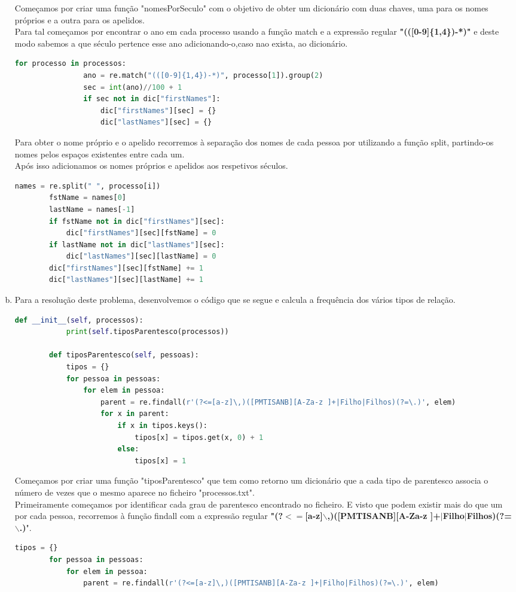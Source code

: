 \documentclass[11pt,a4paper]{report}%
\begin{document}
\begin{enumerate}[a)]
	Começamos por criar uma função "nomesPorSeculo" com o objetivo de obter um dicionário com duas chaves, uma para os nomes próprios e a outra para os apelidos.\\
	Para tal começamos por encontrar o ano em cada processo usando a função match e a expressão regular \textbf{"(([0-9]\{1,4\})-*)"} e deste modo sabemos a que século pertence esse ano adicionando-o,caso nao exista, ao dicionário.
	\begin{lstlisting}[language=python]
			for processo in processos:
				ano = re.match("(([0-9]{1,4})-*)", processo[1]).group(2)
				sec = int(ano)//100 + 1
				if sec not in dic["firstNames"]:
					dic["firstNames"][sec] = {}
					dic["lastNames"][sec] = {}
	\end{lstlisting}
	Para obter o nome próprio e o apelido recorremos à separação dos nomes de cada pessoa por utilizando a função split, partindo-os nomes pelos espaços existentes entre cada um.\\
	Após isso adicionamos os nomes próprios e apelidos aos respetivos séculos.
	\begin{lstlisting}[language=python]
		names = re.split(" ", processo[i])
		fstName = names[0]
		lastName = names[-1]
		if fstName not in dic["firstNames"][sec]:
			dic["firstNames"][sec][fstName] = 0
		if lastName not in dic["lastNames"][sec]:
			dic["lastNames"][sec][lastName] = 0
		dic["firstNames"][sec][fstName] += 1
		dic["lastNames"][sec][lastName] += 1
	\end{lstlisting}
	
	
	\newpage
	
	
	\item Para a resolução deste problema, desenvolvemos o código que se segue e calcula a frequência dos vários tipos de relação.
	
	\begin{lstlisting}[language=python]
		def __init__(self, processos):
			print(self.tiposParentesco(processos))
		
		def tiposParentesco(self, pessoas):
			tipos = {}
			for pessoa in pessoas:
				for elem in pessoa:
					parent = re.findall(r'(?<=[a-z]\,)([PMTISANB][A-Za-z ]+|Filho|Filhos)(?=\.)', elem)
					for x in parent:
						if x in tipos.keys():
							tipos[x] = tipos.get(x, 0) + 1
						else:
							tipos[x] = 1
	\end{lstlisting}
	Começamos por criar uma função "tiposParentesco" que tem como retorno um dicionário que a cada tipo de parentesco associa o número de vezes que o mesmo aparece no ficheiro "processos.txt".\\
	Primeiramente começamos por identificar cada grau de parentesco encontrado no ficheiro. E visto que podem existir mais do que um por cada pessoa, recorremos à função findall com a expressão regular \textbf{"(?$<=$[a-z]$\backslash$,)([PMTISANB][A-Za-z ]+$|$Filho$|$Filhos)(?=$\backslash$.)}".
	\begin{lstlisting}[language=python]
		tipos = {}
		for pessoa in pessoas:
			for elem in pessoa:
				parent = re.findall(r'(?<=[a-z]\,)([PMTISANB][A-Za-z ]+|Filho|Filhos)(?=\.)', elem)   
	\end{lstlisting}
	

\end{enumerate}
\end{document}
